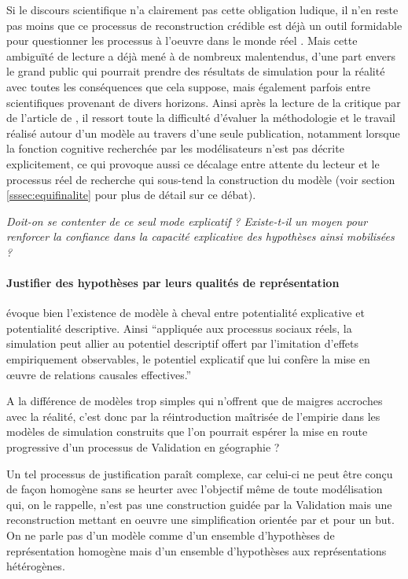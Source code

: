 Si le discours scientifique n'a clairement pas cette obligation ludique, il n'en reste pas moins que ce processus de reconstruction crédible est déjà un outil formidable pour questionner les processus à l'oeuvre dans le monde réel . Mais cette ambiguïté de lecture a déjà mené à de nombreux malentendus, d'une part envers le grand public \autocites{Forrester2007,Deffuant2003} qui pourrait prendre des résultats de simulation pour la réalité avec toutes les conséquences que cela suppose, mais également parfois entre scientifiques provenant de divers horizons. Ainsi après la lecture de la critique par \textcite{Chattoe2011} de l'article de \textcite{Yanoff2008}, il ressort toute la difficulté d'évaluer la méthodologie et le travail réalisé autour d'un modèle au travers d'une seule publication, notamment lorsque la fonction cognitive recherchée par les modélisateurs n'est pas décrite explicitement, ce qui provoque aussi ce décalage entre attente du lecteur et le processus réel de recherche qui sous-tend la construction du modèle (voir section \ref{sssec:equifinalite} pour plus de détail sur ce débat). 

\textit{Doit-on se contenter de ce seul mode explicatif ? Existe-t-il un moyen pour renforcer la confiance dans la capacité explicative des hypothèses ainsi mobilisées ? }

\paragraph{Justifier des hypothèses par leurs qualités de représentation}
\label{justifier_hypothese}

\textcite{Bulle2005} évoque bien l'existence de modèle à cheval entre potentialité explicative et potentialité descriptive. Ainsi \enquote{appliquée aux processus sociaux réels, la simulation peut allier au potentiel descriptif offert par l’imitation d’effets empiriquement observables, le potentiel explicatif que lui confère la mise en œuvre de relations causales effectives.}

A la différence de modèles trop simples qui n'offrent que de maigres accroches avec la réalité, c'est donc par la réintroduction maîtrisée de l'empirie dans les modèles de simulation construits que l'on pourrait espérer la mise en route progressive d'un processus de Validation en géographie ?

Un tel processus de justification paraît complexe, car celui-ci ne peut être conçu de façon homogène sans se heurter avec l'objectif même de toute modélisation qui, on le rappelle, n'est pas une construction guidée par la Validation mais une reconstruction mettant en oeuvre une simplification orientée par et pour un but. On ne parle pas d'un modèle comme d'un ensemble d'hypothèses de représentation homogène mais d'un ensemble d'hypothèses aux représentations hétérogènes.

